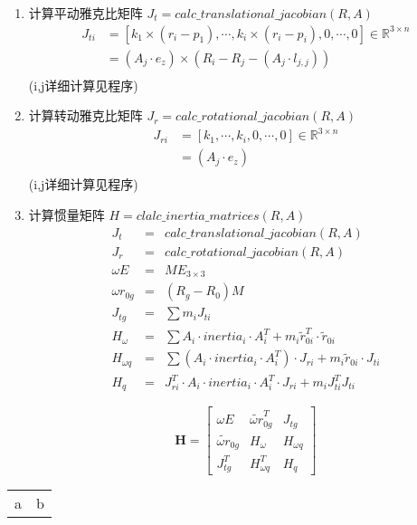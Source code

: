 \documentclass[UTF8]{ctexart}
\begin{document}
\begin{enumerate}[itemindent=0.3em]
	\item 计算平动雅克比矩阵 $ J_t = calc\_translational\_jacobian(R,A)$ 
	\begin{align*}
		J_{ti} &= \left[k_1 \times(r_i-p_1),\cdots,k_i \times(r_i-p_i),0,\cdots,0\right]\in \mathbb{R}^{3\times n}\\
		& = (A_j\cdot e_z) \times (R_i - R_j - (A_j \cdot l_{j,j}))\\
	\end{align*}
	(i,j详细计算见程序)
	\item 计算转动雅克比矩阵 $ J_r = calc\_rotational\_jacobian(R,A)$ 
	\begin{align*}
	J_{r i} &= \left[k_1 ,\cdots,k_i ,0,\cdots,0\right]\in \mathbb{R}^{3\times n}\\
	& = (A_j\cdot e_z) \\
	\end{align*}
	(i,j详细计算见程序)
	\item 计算惯量矩阵 $ H = clalc\_inertia\_matrices(R,A)$
	\begin{eqnarray*}
	 J_t &= &calc\_translational\_jacobian(R,A) \\
	 J_r &= &calc\_rotational\_jacobian(R,A)\\
	 \omega E&=& M E_{3\times3}\\
	 \omega r_{0g}&=& (R_g -R_0)M\\
	 J_{tg} &=& \sum m_i J_{ti}\\
	 H_\omega &=& \sum A_i\cdot inertia_i\cdot A_i^T+m_i\tilde{r}_{0i}^T\cdot\tilde{r}_{0i}	 \\
	 H_{\omega q} &=& \sum (A_i\cdot inertia_i \cdot A_i^T)\cdot J_{ri} + m_i\tilde{r}_{0i}\cdot J_{ti}\\
	 H_q &=& J_{ri}^T\cdot A_i\cdot inertia_i \cdot A_i^T\cdot J_{ri} +m_i J_{ti}^T J_{ti}
	\end{eqnarray*}
	
	\begin{equation*}
	\boldsymbol{H}=\left[\begin{matrix}
	\omega E & \tilde{\omega r}_{0g}^T& J_{tg}\\
	\tilde{\omega r}_{0g} & H_\omega & H_{\omega q}\\
	J_{tg}^T &  H_{\omega q}^T& H_q
	\end{matrix}\right]
	\end{equation*}
\end{enumerate}
\begin{table}[h]
	\centering
	\begin{tabular}{cc}
		a&b
	\end{tabular}
\end{table}
\end{document}
